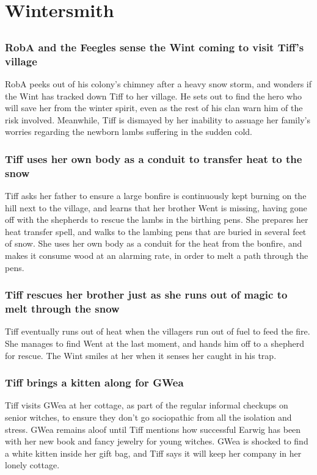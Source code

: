 \section{Wintersmith}


\subsection{}
\subsubsection{\Gls{RobA} and the Feegles sense the \Gls{Wint} coming to visit \Gls{Tiff}'s village}
\Gls{RobA} peeks out of his colony's chimney after a heavy snow storm, and wonders if the \Gls{Wint}
has tracked down \Gls{Tiff} to her village. He sets out to find the hero who will save her from
the winter spirit, even as the rest of his clan warn him of the risk involved. Meanwhile, \Gls{Tiff}
is dismayed by her inability to assuage her family's worries regarding the newborn lambs suffering
in the sudden cold.

\subsubsection{\Gls{Tiff} uses her own body as a conduit to transfer heat to the snow}
\Gls{Tiff} asks her father to ensure a large bonfire is continuously kept burning on the hill next
to the village, and learns that her brother \Gls{Went} is missing, having gone off with the
shepherds to rescue the lambs in the birthing pens. She prepares her heat transfer spell, and walks
to the lambing pens that are buried in several feet of snow. She uses her own body as a conduit for
the heat from the bonfire, and makes it consume wood at an alarming rate, in order to melt a path
through the pens.

\subsubsection{\Gls{Tiff} rescues her brother just as she runs out of magic to melt through the
    snow}
\Gls{Tiff} eventually runs out of heat when the villagers run out of fuel to feed the fire. She
manages to find \Gls{Went} at the last moment, and hands him off to a shepherd for rescue. The
\Gls{Wint} smiles at her when it senses her caught in his trap.

\subsubsection{\Gls{Tiff} brings a kitten along for \Gls{GWea}}
\Gls{Tiff} visits \Gls{GWea} at her cottage, as part of the regular informal checkups on senior
witches, to ensure they don't go sociopathic from all the isolation and stress. \Gls{GWea} remains
aloof until \Gls{Tiff} mentions how successful \Gls{Earwig} has been with her new book and fancy
jewelry for young witches. \Gls{GWea} is shocked to find a white kitten inside her gift bag, and
\Gls{Tiff} says it will keep her company in her lonely cottage.

